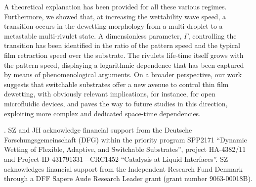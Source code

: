 \documentclass[twocolumn,amsmath,amssymb,showpacs,prl,superscriptaddress]{revtex4-1} %
\begin{document}
A theoretical explanation has been provided for all these various regimes.
Furthermore, we showed that, at increasing the wettability wave speed, a transition occurs in the dewetting morphology from a multi-droplet to a metastable multi-rivulet state. 
A dimensionless parameter, $\Gamma$, controlling the transition has been identified in the ratio of the pattern speed and the typical film retraction speed over the substrate. 
The rivulets life-time itself grows with the pattern speed, displaying a logarithmic dependence that has been captured by means of phenomenological arguments.
On a broader perspective, our work suggests that switchable substrates offer a new avenue to control thin film dewetting, with obviously relevant implications, for instance, for open microfluidic devices, and paves the way to future studies in this direction, exploiting more complex and dedicated space-time dependencies.


. SZ and JH acknowledge financial support from the Deutsche Forschungsgemeinschaft (DFG) within the priority program SPP2171 ``Dynamic Wetting of Flexible, Adaptive, and Switchable Substrates'', project HA-4382/11 and Project-ID 431791331—CRC1452 ``Catalysis at Liquid Interfaces''. SZ acknowledges financial support from the Independent Research Fund Denmark through a DFF Sapere Aude Research Leader grant (grant number 9063-00018B). 



\end{document}
